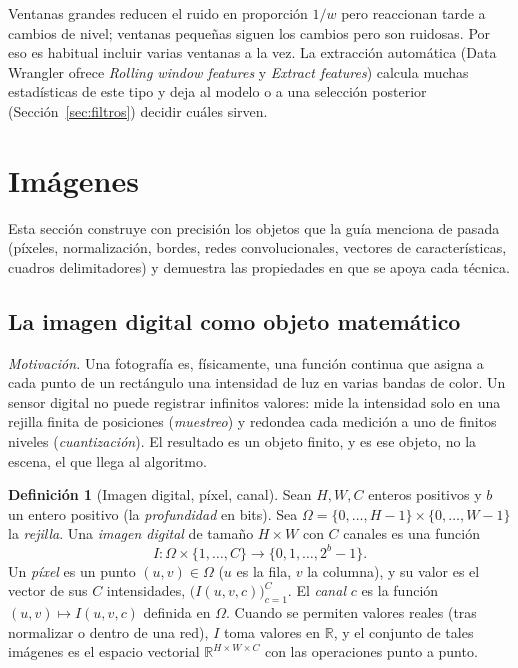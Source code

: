 \documentclass[11pt]{article}
\theoremstyle{definition}
\newtheorem{definicion}[teorema]{Definición}
\theoremstyle{remark}
\newcommand{\R}{\mathbb{R}}
\begin{document}
\noindent Ventanas grandes reducen el ruido en proporción $1/w$ pero reaccionan tarde a cambios de nivel; ventanas pequeñas siguen los cambios pero son ruidosas. Por eso es habitual incluir varias ventanas a la vez. La extracción automática (Data Wrangler ofrece \emph{Rolling window features} y \emph{Extract features}) calcula muchas estadísticas de este tipo y deja al modelo o a una selección posterior (Sección~\ref{sec:filtros}) decidir cuáles sirven.

\section{Imágenes}\label{sec:imagenes}

\noindent Esta sección construye con precisión los objetos que la guía menciona de pasada (píxeles, normalización, bordes, redes convolucionales, vectores de características, cuadros delimitadores) y demuestra las propiedades en que se apoya cada técnica.

\subsection{La imagen digital como objeto matemático}\label{sec:imagen-digital}

\noindent \emph{Motivación.} Una fotografía es, físicamente, una función continua que asigna a cada punto de un rectángulo una intensidad de luz en varias bandas de color. Un sensor digital no puede registrar infinitos valores: mide la intensidad solo en una rejilla finita de posiciones (\emph{muestreo}) y redondea cada medición a uno de finitos niveles (\emph{cuantización}). El resultado es un objeto finito, y es ese objeto, no la escena, el que llega al algoritmo.

\begin{definicion}[Imagen digital, píxel, canal]\label{def:imagen}
\noindent Sean $H,W,C$ enteros positivos y $b$ un entero positivo (la \emph{profundidad} en bits). Sea $\Omega=\{0,\dots,H-1\}\times\{0,\dots,W-1\}$ la \emph{rejilla}. Una \emph{imagen digital} de tamaño $H\times W$ con $C$ canales es una función
\[
I:\Omega\times\{1,\dots,C\}\to\{0,1,\dots,2^b-1\}.
\]
Un \emph{píxel} es un punto $(u,v)\in\Omega$ ($u$ es la fila, $v$ la columna), y su valor es el vector de sus $C$ intensidades, $\big(I(u,v,c)\big)_{c=1}^{C}$. El \emph{canal} $c$ es la función $(u,v)\mapsto I(u,v,c)$ definida en $\Omega$. Cuando se permiten valores reales (tras normalizar o dentro de una red), $I$ toma valores en $\R$, y el conjunto de tales imágenes es el espacio vectorial $\R^{H\times W\times C}$ con las operaciones punto a punto.
\end{definicion}
\end{document}

